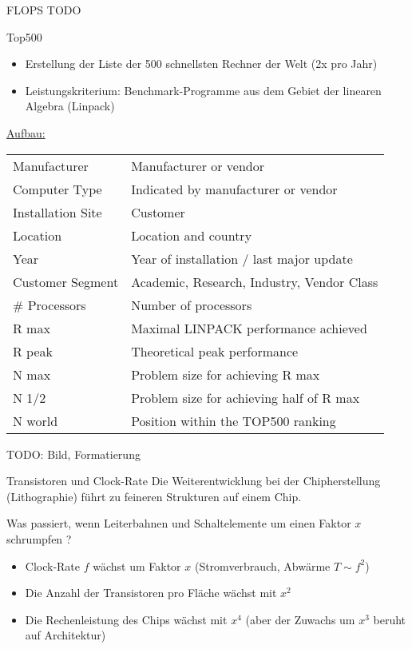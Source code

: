 \begin{example}[Leistungsmaß]{FLOPS}
    TODO
\end{example}

\begin{bonus}{Top500}
    \begin{itemize}
        \item Erstellung der Liste der 500 schnellsten Rechner der Welt (2x pro Jahr)
        \item Leistungskriterium: Benchmark-Programme aus dem Gebiet der linearen Algebra (Linpack)
    \end{itemize}
    \underline{Aufbau:}\\
    \begin{tabularx}{\textwidth}{|l|l|}
        Manufacturer      & Manufacturer or vendor                     \\
        Computer Type     & Indicated by manufacturer or vendor        \\
        Installation Site & Customer                                   \\
        Location          & Location and country                       \\
        Year              & Year of installation / last major update   \\
        Customer Segment  & Academic, Research, Industry, Vendor Class \\
        \# Processors     & Number of processors                       \\
        R max             & Maximal LINPACK performance achieved       \\
        R peak            & Theoretical peak performance               \\
        N max             & Problem size for achieving R max           \\
        N 1/2             & Problem size for achieving half of R max   \\
        N world           & Position within the TOP500 ranking         \\
    \end{tabularx}
    TODO: Bild, Formatierung
\end{bonus}

\begin{bonus}{Transistoren und Clock-Rate}
    Die Weiterentwicklung bei der Chipherstellung (Lithographie) führt zu feineren Strukturen auf einem Chip.

    Was passiert, wenn Leiterbahnen und Schaltelemente um einen Faktor $x$ schrumpfen ?
    \begin{itemize}
        \item Clock-Rate $f$ wächst um Faktor $x$ (Stromverbrauch, Abwärme $T \sim f^2$)
        \item Die Anzahl der Transistoren pro Fläche wächst mit $x^2$
        \item Die Rechenleistung des Chips wächst mit $x^4$ (aber der Zuwachs um $x^3$ beruht auf Architektur)
    \end{itemize}
\end{bonus}

